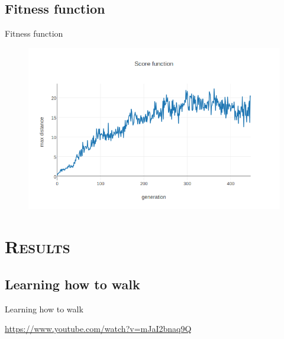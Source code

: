 \documentclass[xcolor=x11names,compress]{beamer}
\renewcommand{\(}{\begin{columns}}
\renewcommand{\)}{\end{columns}}
\newcommand{\<}[1]{\begin{column}{#1}}
\renewcommand{\>}{\end{column}}
\begin{document}
\subsection{Fitness function}
\begin{frame}{Fitness function}

	\begin{figure} \includegraphics[width=\textwidth]{score_function.png}  \end{figure}


\end{frame}

\section{\scshape Results}
\subsection{Learning how to walk}
\begin{frame}{Learning how to walk}
\begin{center}
\href{https://www.youtube.com/watch?v=mJaI2bnaq9Q}{https://www.youtube.com/watch?v=mJaI2bnaq9Q}

\end{center}
\end{frame}
\end{document}
